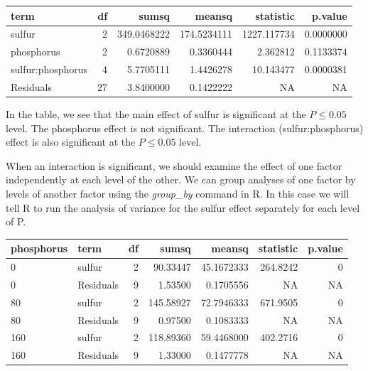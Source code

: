 \documentclass[
]{book}
\newenvironment{Shaded}{\begin{snugshade}}{\end{snugshade}}
\newcommand{\AttributeTok}[1]{\textcolor[rgb]{0.77,0.63,0.00}{#1}}
\newcommand{\FunctionTok}[1]{\textcolor[rgb]{0.00,0.00,0.00}{#1}}
\newcommand{\NormalTok}[1]{#1}
\newcommand{\OtherTok}[1]{\textcolor[rgb]{0.56,0.35,0.01}{#1}}
\newcommand{\SpecialCharTok}[1]{\textcolor[rgb]{0.00,0.00,0.00}{#1}}
\newcommand{\StringTok}[1]{\textcolor[rgb]{0.31,0.60,0.02}{#1}}
\begin{document}
\begin{tabular}{l|r|r|r|r|r}
\hline
term & df & sumsq & meansq & statistic & p.value\\
\hline
sulfur & 2 & 349.0468222 & 174.5234111 & 1227.117734 & 0.0000000\\
\hline
phosphorus & 2 & 0.6720889 & 0.3360444 & 2.362812 & 0.1133374\\
\hline
sulfur:phosphorus & 4 & 5.7705111 & 1.4426278 & 10.143477 & 0.0000381\\
\hline
Residuals & 27 & 3.8400000 & 0.1422222 & NA & NA\\
\hline
\end{tabular}

In the table, we see that the main effect of sulfur is significant at the \(P \le 0.05\) level. The phosphorus effect is not significant. The interaction (sulfur:phosphorus) effect is also significant at the \(P\le0.05\) level.

When an interaction is significant, we should examine the effect of one factor independently at each level of the other. We can group analyses of one factor by levels of another factor using the \emph{group\_by} command in R. In this case we will tell R to run the analysis of variance for the sulfur effect separately for each level of P.

\begin{Shaded}
\end{Shaded}

\begin{tabular}{l|l|r|r|r|r|r}
\hline
phosphorus & term & df & sumsq & meansq & statistic & p.value\\
\hline
0 & sulfur & 2 & 90.33447 & 45.1672333 & 264.8242 & 0\\
\hline
0 & Residuals & 9 & 1.53500 & 0.1705556 & NA & NA\\
\hline
80 & sulfur & 2 & 145.58927 & 72.7946333 & 671.9505 & 0\\
\hline
80 & Residuals & 9 & 0.97500 & 0.1083333 & NA & NA\\
\hline
160 & sulfur & 2 & 118.89360 & 59.4468000 & 402.2716 & 0\\
\hline
160 & Residuals & 9 & 1.33000 & 0.1477778 & NA & NA\\
\hline
\end{tabular}
\end{document}
